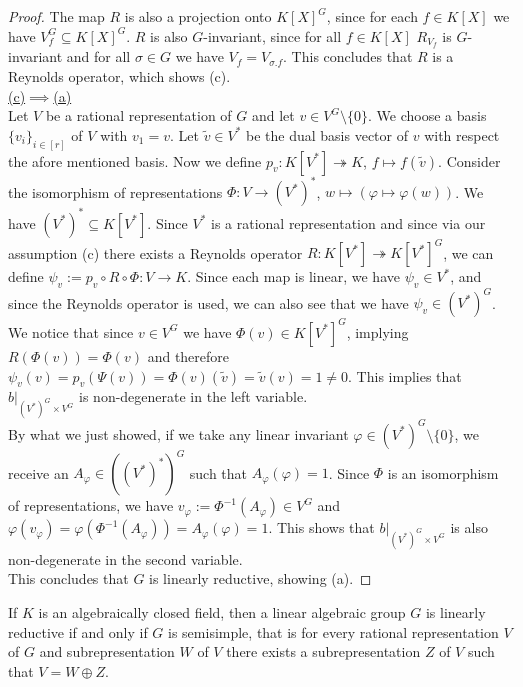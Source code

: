\begin{proof}
  The map $R$ is also a projection onto $K[X]^G$, since for each $f \in K[X]$ we have $V_f^G \subseteq K[X]^G$.
  $R$ is also $G$-invariant, since for all $f \in K[X]$ $R_{V_f}$ is $G$-invariant and for all $\sigma \in G$ we have $V_f = V_{\sigma.f}$.
  This concludes that $R$ is a Reynolds operator, which shows (c).  \\
  \underline{(c)$\implies$(a)}  \\
  Let $V$ be a rational representation of $G$ and let $v \in V^G \setminus \{0\}$.
  We choose a basis $\{v_i\}_{i\in [r]}$ of $V$ with $v_1 = v$.
  Let $\tilde{v} \in V^\ast$ be the dual basis vector of $v$ with respect the afore mentioned basis.
  Now we define $p_v \colon K[V^\ast] \twoheadrightarrow K$, $f \mapsto f(\tilde{v})$.
  Consider the isomorphism of representations $\Phi \colon V \rightarrow (V^\ast)^\ast$, $w \mapsto (\varphi \mapsto \varphi (w))$.
  We have $(V^\ast)^\ast \subseteq K[V^\ast]$.
  Since $V^\ast$ is a rational representation and since via our assumption (c) there exists a Reynolds operator $R \colon K[V^\ast] \twoheadrightarrow K[V^\ast]^G$, we can define $ \psi_v := p_v \circ R \circ \Phi \colon V \rightarrow K$.
  Since each map is linear, we have $\psi_v \in V^\ast$, and since the Reynolds operator is used, we can also see that we have $\psi_v \in (V^\ast)^G$.
  We notice that since $v \in V^G$ we have $\Phi (v) \in K[V^\ast]^G$, implying $R(\Phi(v))=\Phi(v)$ and therefore $\psi_v (v) = p_v (\Psi(v)) = \Phi (v) (\tilde{v}) = \tilde{v} (v) = 1 \neq 0$.
  This implies that $\left. b\right|_{(V^\ast)^G \times V^G}$ is non-degenerate in the left variable.\\
  By what we just showed, if we take any linear invariant $\varphi \in (V^\ast)^G \setminus \{0\}$, we receive an $A_\varphi \in ((V^\ast)^\ast)^G$ such that $A_\varphi(\varphi) = 1$.
  Since $\Phi$ is an isomorphism of representations, we have $v_\varphi := \Phi^{-1}(A_\varphi) \in V^G$ and $\varphi (v_\varphi) = \varphi (\Phi^{-1}(A_\varphi)) = A_\varphi (\varphi) = 1$.
  This shows that $\left. b\right|_{(V^\ast)^G \times V^G}$ is also non-degenerate in the second variable.\\
  This concludes that $G$ is linearly reductive, showing (a).
\end{proof}

\begin{theorem}\label{decomp}
  If $K$ is an algebraically closed field, then a linear algebraic group $G$ is linearly reductive if and only if $G$ is semisimple, that is for every rational representation $V$ of $G$ and subrepresentation $W$ of $V$ there exists a subrepresentation $Z$ of $V$ such that $V = W \oplus Z$.
\end{theorem}

